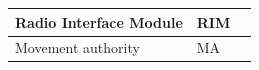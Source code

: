 \documentclass[nocc]{template/openetcs_report}
\begin{document}
\begin{longtable}{|l|l|l|}
				\hline
				\begin{minipage}[t]{0.40\linewidth} Radio Interface Module	\end{minipage} 
				&	\begin{minipage}[t]{0.20\linewidth} RIM\end{minipage} 
				&	\begin{minipage}[t]{0.40\linewidth}\end{minipage} \\
				
				\hline
				\begin{minipage}[t]{0.40\linewidth} Movement authority	\end{minipage} 
				&	\begin{minipage}[t]{0.20\linewidth} MA\end{minipage} 
				&	\begin{minipage}[t]{0.40\linewidth}\end{minipage} \\
				
				\hline
				
																																								
			\end{longtable}	
\end{document}
